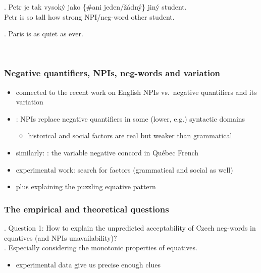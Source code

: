 \documentclass[
  letterpaper,
  DIV=11,
  numbers=noendperiod]{scrartcl}
\providecommand{\tightlist}{%
  \setlength{\itemsep}{0pt}\setlength{\parskip}{0pt}}\usepackage{longtable,booktabs,array}
\begin{document}
\exg. Petr je tak vysoký jako \{\#ani jeden/žádný\} jiný student.\\
Petr is so tall how strong NPI/neg-word other student.\\
\hspace*{0.333em}

\ex. Paris is as quiet as ever.

~

\hypertarget{negative-quantifiers-npis-neg-words-and-variation}{%
\subsubsection{Negative quantifiers, NPIs, neg-words and
variation}\label{negative-quantifiers-npis-neg-words-and-variation}}

\begin{itemize}
\tightlist
\item
  connected to the recent work on English NPIs vs.~negative quantifiers
  and its variation
\item
  \cite{tottie1991negation,burnett2018structural}: NPIs replace negative
  quantifiers in some (lower, e.g.) syntactic domains

  \begin{itemize}
  \tightlist
  \item
    historical and social factors are real but weaker than grammatical
  \end{itemize}
\item
  similarly: \cite{burnett2015variable}: the variable negative concord
  in Québec French
\item
  experimental work: search for factors (grammatical and social as well)
\item
  plus explaining the puzzling equative pattern
\end{itemize}

\hypertarget{the-empirical-and-theoretical-questions}{%
\subsubsection{The empirical and theoretical
questions}\label{the-empirical-and-theoretical-questions}}

\ex. Question 1: How to explain the unpredicted acceptability of Czech
neg-words in equatives (and NPIs unavailability)?\\
\a. Especially considering the monotonic properties of equatives.

\begin{itemize}
\tightlist
\item
  experimental data give us precise enough clues
\end{itemize}
\end{document}
